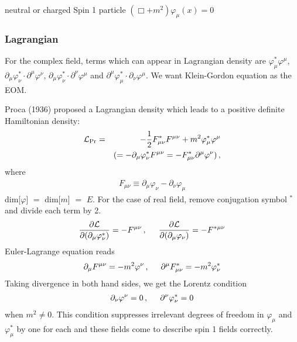 \noindent
neutral or charged Spin 1 particle
$\left( \Box + m^2 \right) \varphi_\mu(x) = 0$


\subsubsection{Lagrangian}
For the complex field, terms which can appear in Lagrangian density are 
$\varphi^*_\mu \varphi^\mu$, 
$\partial_\mu \varphi^*_\nu \cdot \partial^\mu \varphi^\nu$, 
$\partial_\mu \varphi^*_\nu \cdot \partial^\nu \varphi^\mu$
and
$\partial^\mu \varphi^*_\mu \cdot \partial_\nu \varphi^\mu$.
We want Klein-Gordon equation as  the EOM.

Proca (1936) proposed a Lagrangian density which leads to a positive definite Hamiltonian density:
\begin{eqnarray}
{\cal L}_{\mbox{\scriptsize Pr}} &=&
-\frac{1}{2} F^*_{\mu\nu} F^{\mu\nu}
+ m^2 \varphi_\mu^* \varphi^\mu
\label{eqn:ProcaLagdens}
\\
&&
(
=
- \partial_\mu \varphi^*_\nu
F^{\mu \nu}
=
- F^*_{\mu \nu}
\partial^\mu \varphi^\nu
)
\nonumber
\,,
\end{eqnarray}
where
\begin{eqnarray}
F_{\mu \nu} \equiv
\partial_\mu \varphi_\nu
-
\partial_\nu \varphi_\mu
\end{eqnarray}
dim[$\varphi$] $=$ dim[$m$] $=$ $E$.
For the case of real field, remove conjugation symbol ${}^*$ and divide each term by 2.
\begin{eqnarray}
\frac{\partial \mathcal{L}}
{\partial (\partial_\mu \varphi_\nu^*)}
=
-F^{\mu \nu}
\,,
\hspace{5mm}
\frac{\partial \mathcal{L}}
{\partial (\partial_\mu \varphi_\nu)}
=
-F^{*\mu \nu}
\end{eqnarray}
Euler-Lagrange equation reads
\begin{eqnarray}
\partial_\mu F^{\mu \nu} = - m^2 \varphi^\nu
\,,
\hspace{5mm}
\partial^\mu F^*_{\mu \nu} = - m^2 \varphi_\nu^*
\label{eqn:massRealProcaEOM}
\end{eqnarray}
Taking divergence in both hand sides, we get the Lorentz condition
\begin{eqnarray}
\partial_\nu \varphi^\nu = 0\,,
\hspace{5mm}
\partial^\nu \varphi^*_\nu = 0
\label{eqn:massVProcaCond}
\end{eqnarray}
when $m^2 \neq 0$.
This condition suppresses irrelevant degrees of freedom in $\varphi_\mu$ and $\varphi^*_\mu$
by one for each and these fields come to describe spin 1 fields correctly.
